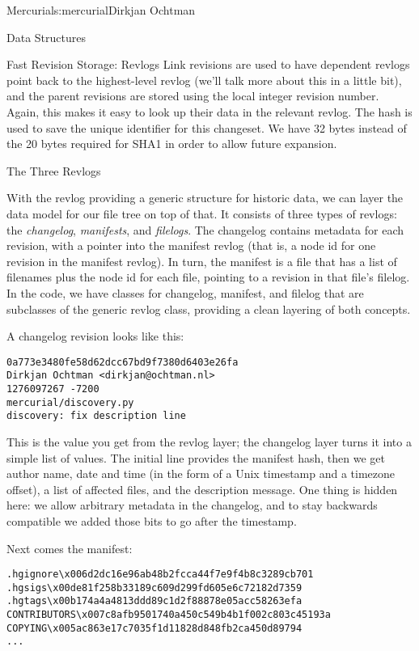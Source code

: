 \begin{aosachapter}{Mercurial}{s:mercurial}{Dirkjan Ochtman}
\begin{aosasect1}{Data Structures}
\begin{aosasect2}{Fast Revision Storage: Revlogs}
Link revisions are used to have dependent revlogs point back to the
highest-level revlog (we'll talk more about this in a little bit), and
the parent revisions are stored using the local integer revision
number. Again, this makes it easy to look up their data in the
relevant revlog. The hash is used to save the unique identifier for
this changeset. We have 32 bytes instead of the 20 bytes required for
SHA1 in order to allow future expansion.

\end{aosasect2}

\begin{aosasect2}{The Three Revlogs}

With the revlog providing a generic structure for historic data, we
can layer the data model for our file tree on top of that. It consists
of three types of revlogs: the \emph{changelog}, \emph{manifests}, and
\emph{filelogs}. The changelog contains metadata for each revision,
with a pointer into the manifest revlog (that is, a node id for one
revision in the manifest revlog). In turn, the manifest is a file that
has a list of filenames plus the node id for each file, pointing to a
revision in that file's filelog. In the code, we have classes for
changelog, manifest, and filelog that are subclasses of the generic
revlog class, providing a clean layering of both concepts.


A changelog revision looks like this:

\begin{verbatim}
0a773e3480fe58d62dcc67bd9f7380d6403e26fa
Dirkjan Ochtman <dirkjan@ochtman.nl>
1276097267 -7200
mercurial/discovery.py
discovery: fix description line
\end{verbatim}

\noindent This is the value you get from the revlog layer; the changelog layer
turns it into a simple list of values. The initial line provides the
manifest hash, then we get author name, date and time (in the form of
a Unix timestamp and a timezone offset), a list of affected files, and
the description message. One thing is hidden here: we allow arbitrary
metadata in the changelog, and to stay backwards compatible we added
those bits to go after the timestamp.

Next comes the manifest:

\begin{verbatim}
.hgignore\x006d2dc16e96ab48b2fcca44f7e9f4b8c3289cb701
.hgsigs\x00de81f258b33189c609d299fd605e6c72182d7359
.hgtags\x00b174a4a4813ddd89c1d2f88878e05acc58263efa
CONTRIBUTORS\x007c8afb9501740a450c549b4b1f002c803c45193a
COPYING\x005ac863e17c7035f1d11828d848fb2ca450d89794
...
\end{verbatim}


\end{aosasect2}
\end{aosasect1}
\end{aosachapter}
